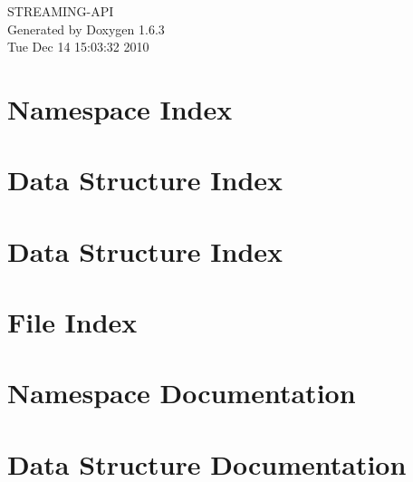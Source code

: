 \documentclass[a4paper]{book}
\begin{document}
\hypersetup{pageanchor=false}
\begin{titlepage}
\vspace*{7cm}
\begin{center}
{\Large STREAMING-\/API }\\
\vspace*{1cm}
{\large Generated by Doxygen 1.6.3}\\
\vspace*{0.5cm}
{\small Tue Dec 14 15:03:32 2010}\\
\end{center}
\end{titlepage}
\clearemptydoublepage
{}
\tableofcontents
\clearemptydoublepage
{}
\hypersetup{pageanchor=true}
\chapter{Namespace Index}

\chapter{Data Structure Index}

\chapter{Data Structure Index}

\chapter{File Index}

\chapter{Namespace Documentation}




\chapter{Data Structure Documentation}













\end{document}
